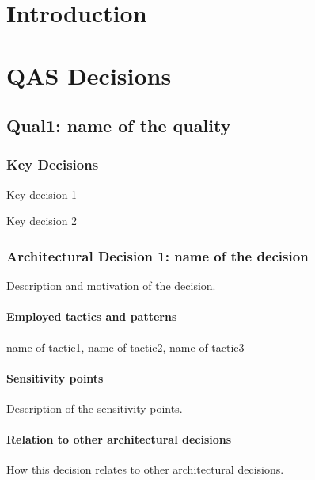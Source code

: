 
\chapter{Introduction}\label{sec:introduction}


\chapter{QAS Decisions}\label{sec:decisions}


\section{Qual1: name of the quality}
\subsection*{Key Decisions}
\begin{adlist}
  \item Key decision 1

  \item Key decision 2
\end{adlist}

\subsection*{Architectural Decision 1:
name of the decision}

Description and motivation of the decision.

\subsubsection*{Employed tactics and patterns}
name of tactic1,
name of tactic2,
name of tactic3

\subsubsection*{Sensitivity points}
Description of the sensitivity points.

\subsubsection*{Relation to other architectural decisions}
How this decision relates to other architectural decisions.

